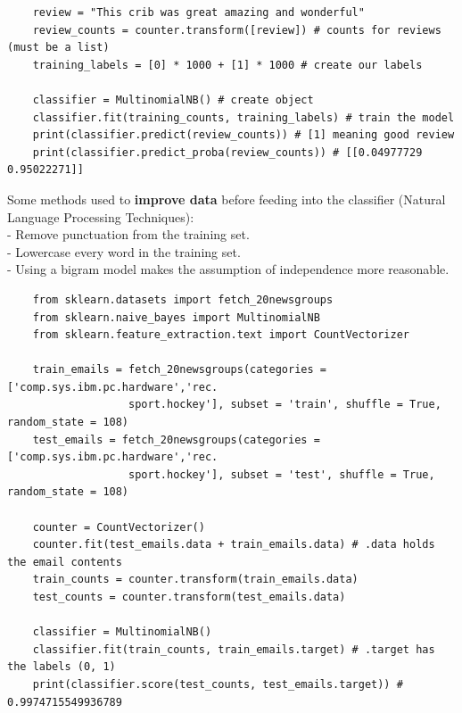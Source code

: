 \documentclass[11pt, a4paper]{article}
\begin{document}
\begin{spacing}{1.1}
\begin{lstlisting}
	review = "This crib was great amazing and wonderful"
	review_counts = counter.transform([review]) # counts for reviews (must be a list)
	training_labels = [0] * 1000 + [1] * 1000 # create our labels
	
	classifier = MultinomialNB() # create object
	classifier.fit(training_counts, training_labels) # train the model
	print(classifier.predict(review_counts)) # [1] meaning good review
	print(classifier.predict_proba(review_counts)) # [[0.04977729 0.95022271]] \end{lstlisting} \vspace*{1mm}
	Some methods used to \textbf{improve data} before feeding into the classifier (Natural Language Processing Techniques): \\
	\hspace*{3mm} - Remove punctuation from the training set. \\
	\hspace*{3mm} - Lowercase every word in the training set. \\
	\hspace*{3mm} - Using a bigram model makes the assumption of independence more reasonable. 
	\begin{lstlisting}
	from sklearn.datasets import fetch_20newsgroups
	from sklearn.naive_bayes import MultinomialNB
	from sklearn.feature_extraction.text import CountVectorizer
	
	train_emails = fetch_20newsgroups(categories = ['comp.sys.ibm.pc.hardware','rec.
	               sport.hockey'], subset = 'train', shuffle = True, random_state = 108)
	test_emails = fetch_20newsgroups(categories = ['comp.sys.ibm.pc.hardware','rec.
	               sport.hockey'], subset = 'test', shuffle = True, random_state = 108)
	
	counter = CountVectorizer()
	counter.fit(test_emails.data + train_emails.data) # .data holds the email contents
	train_counts = counter.transform(train_emails.data)
	test_counts = counter.transform(test_emails.data)
	
	classifier = MultinomialNB()
	classifier.fit(train_counts, train_emails.target) # .target has the labels (0, 1)
	print(classifier.score(test_counts, test_emails.target)) # 0.9974715549936789 \end{lstlisting} \newpage


\end{spacing}
\end{document}
